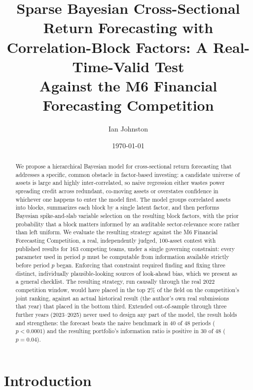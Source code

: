 \documentclass[11pt]{article}
\title{Sparse Bayesian Cross-Sectional Return Forecasting with\\
Correlation-Block Factors: A Real-Time-Valid Test\\
Against the M6 Financial Forecasting Competition}
\author{Ian Johnston}
\date{\today}
\begin{document}
\maketitle

\begin{abstract}
\noindent
We propose a hierarchical Bayesian model for cross-sectional return
forecasting that addresses a specific, common obstacle in factor-based
investing: a candidate universe of assets is large and highly
inter-correlated, so naive regression either wastes power spreading
credit across redundant, co-moving assets or overstates confidence in
whichever one happens to enter the model first. The model groups
correlated assets into blocks, summarizes each block by a single latent
factor, and then performs Bayesian spike-and-slab variable selection on
the resulting block factors, with the prior probability that a block
matters informed by an auditable sector-relevance score rather than left
uniform. We evaluate the resulting strategy against the M6 Financial
Forecasting Competition, a real, independently judged, 100-asset
contest with published results for 163 competing teams, under a single
governing constraint: every parameter used in period $p$ must be
computable from information available strictly before period $p$ began.
Enforcing that constraint required finding and fixing three distinct,
individually plausible-looking sources of look-ahead bias, which we
present as a general checklist. The resulting strategy, run causally
through the real 2022 competition window, would have placed in the top
2\% of the field on the competition's joint ranking, against an actual
historical result (the author's own real submissions that year) that
placed in the bottom third. Extended out-of-sample through three further
years (2023--2025) never used to design any part of the model, the
result holds and strengthens: the forecast beats the naive benchmark in
40 of 48 periods ($p<0.0001$) and the resulting portfolio's information
ratio is positive in 30 of 48 ($p=0.04$).
\end{abstract}

\section{Introduction}
\end{document}
